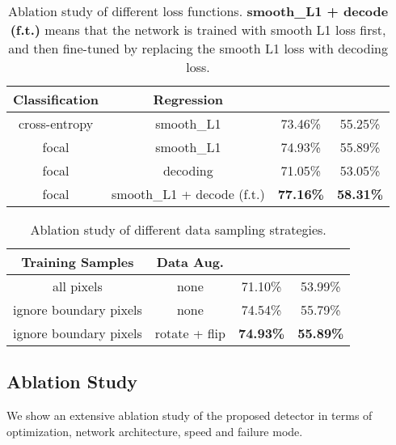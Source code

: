 \begin{table}[t]
\begin{center}
\begin{small}
\begin{tabular}{|c|c|cc|}
\hline
Classification & Regression &  &  \\
\hline
cross-entropy & smooth\_L1 & 73.46\% & 55.25\%\\
focal & smooth\_L1 & 74.93\% & 55.89\% \\
focal & decoding & 71.05\% & 53.05\% \\
focal & smooth\_L1 + decode (f.t.) & {\bf 77.16\%} & {\bf 58.31\%} \\
\hline
\end{tabular}
\caption{Ablation study of different loss functions. {\bf smooth\_L1 + decode (f.t.)} means that the network is trained with smooth L1 loss first, and then fine-tuned by replacing the smooth L1 loss with decoding loss.}
\label{tab:loss}
\end{small}
\end{center}
\vspace{-0.3cm}

\end{table}
\begin{table}[t]
\begin{center}
\begin{small}
\begin{tabular}{|c|c|cc|}
\hline
Training Samples & Data Aug. &  &  \\
\hline
all pixels & none & 71.10\% & 53.99\% \\
ignore boundary pixels & none & 74.54\% & 55.79\% \\
ignore boundary pixels & rotate + flip & {\bf 74.93\%} & {\bf 55.89\%} \\
\hline
\end{tabular}
\caption{Ablation study of different data sampling strategies.}
\label{tab:sample}
\end{small}
\end{center}
\vspace{-0.5cm}
\end{table}


\subsection{Ablation Study}

We show an extensive ablation study of the proposed detector in terms of optimization, network architecture, speed and failure mode.

